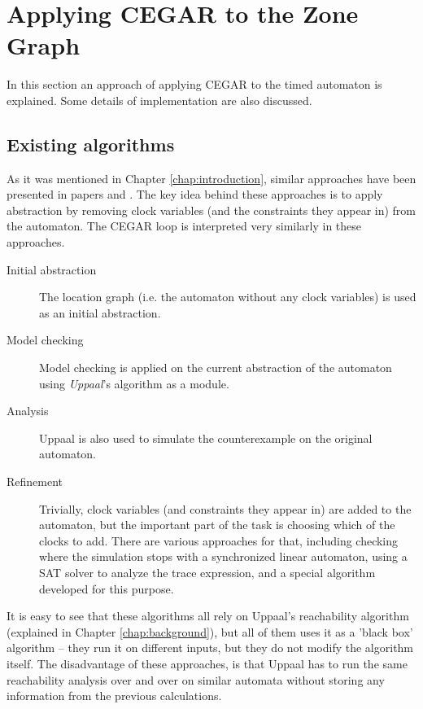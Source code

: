 \chapter{Applying CEGAR to the Zone Graph} \label{sec:timed_cegar}

In this section an approach of applying CEGAR to the timed
automaton is explained. Some details of implementation are also
discussed.

\section{Existing algorithms}
  
 As it was mentioned in Chapter \ref{chap:introduction}, similar approaches have been presented in papers \cite{dierks2007automatic, he2010compositional} and \cite{okano2011clock}. The key idea behind these approaches
 is to apply abstraction by removing clock variables (and the constraints they appear in) from the automaton. The CEGAR loop is interpreted very similarly in these approaches.
 
 \begin{description}
 	\item[Initial abstraction] The location graph (i.e. the automaton without any clock variables) is used as an initial abstraction.
 	\item[Model checking] Model checking is applied on the current abstraction of the automaton using \emph{Uppaal}'s algorithm as a module.
 	\item[Analysis] Uppaal is also used to simulate the counterexample on the original automaton.
 	\item[Refinement] Trivially, clock variables (and constraints they appear in) are added to the automaton, but the important part of the task is choosing which of the clocks to add. There are various approaches for that, including checking where the simulation stops with a synchronized linear automaton, using a SAT solver to analyze the trace expression, and a special algorithm developed for this purpose.
 \end{description}
 
 It is easy to see that these algorithms all rely on Uppaal's reachability algorithm (explained in Chapter \ref{chap:background}), but all of them uses it as a 'black box' algorithm -- they run it on different inputs, but they do not modify the algorithm itself. The disadvantage of these approaches, is that Uppaal has to run the same reachability analysis over and over on similar automata without storing any information from the previous calculations.
 
